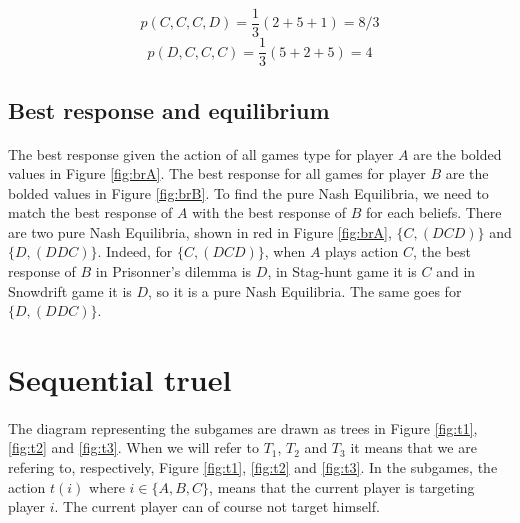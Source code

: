 \documentclass[letterpaper]{article}
\begin{document}
\begin{equation}
    p(C, C, C, D) = \frac{1}{3}(2 + 5 + 1) = 8/3
\end{equation}
\begin{equation}
    p(D, C, C, C) = \frac{1}{3}(5 + 2 + 5) = 4
\end{equation}

\subsection{Best response and equilibrium}

\paragraph{}

The best response given the action of all games type for player $A$ are
the bolded values in
Figure \ref{fig:brA}. The best response for all games for player $B$ are
the bolded values in
Figure \ref{fig:brB}. To find the pure Nash Equilibria, we need to match
the best response of $A$ with the best response of $B$ for each beliefs. There
are two pure Nash Equilibria, shown in red in Figure \ref{fig:brA},
$\{C, (DCD)\}$ and $\{D, (DDC)\}$. Indeed, for $\{C, (DCD)\}$,
when $A$ plays action $C$, the best
response of $B$ in Prisonner's dilemma is $D$, in Stag-hunt game it is $C$ and
in Snowdrift game it is $D$, so it is a pure Nash Equilibria. The same
goes for $\{D, (DDC)\}$.

\section{Sequential truel}

\paragraph{}

The diagram representing the subgames are drawn as trees in
Figure \ref{fig:t1}, \ref{fig:t2} and \ref{fig:t3}. When we will refer to $T_1$,
$T_2$ and $T_3$ it means that we are refering to, respectively,
Figure \ref{fig:t1}, \ref{fig:t2} and \ref{fig:t3}. In the subgames,
the action $t(i)$ where $i \in \{A, B, C\}$, means that the current player
is targeting player $i$. The current player can of course not target himself.

\paragraph{}
\end{document}
